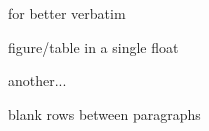 \usepackage{graphicx} %

\usepackage[strict]{csquotes}
\usepackage[natbib,backend=biber,style=authoryear-comp,maxbibnames=99]{
biblatex}


\usepackage[all]{foreign}

\usepackage{booktabs} %
\usepackage[inline]{enumitem}

\usepackage{verbatim} %
for better verbatim
\usepackage{caption} %
figure/table in a single float
\usepackage{minted}

\usepackage{hyperref}
another...
\usepackage{cleveref}

\usepackage{multirow}%


\usepackage[parfill]{parskip} %
blank rows between paragraphs\usepackage[parfill]{parskip}

